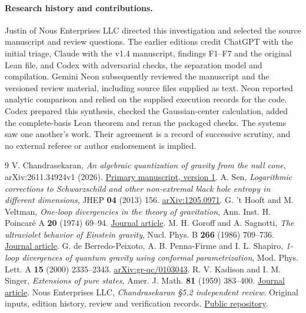 \documentclass[11pt]{article}
\begin{document}
\paragraph{Research history and contributions.}
Justin of Nous Enterprises LLC directed this investigation and selected the source manuscript and review questions. The earlier editions credit ChatGPT with the initial triage, Claude with the v1.4 manuscript, findings F1--F7 and the original Lean file, and Codex with adversarial checks, the separation model and compilation. Gemini Neon subsequently reviewed the manuscript and the versioned review material, including source files supplied as text. Neon reported analytic comparison and relied on the supplied execution records for the code. Codex prepared this synthesis, checked the Gaussian-center calculation, added the complete-basis Lean theorem and reran the packaged checks. The systems saw one another's work. Their agreement is a record of successive scrutiny, and no external referee or author endorsement is implied.

\clearpage{}
\begin{thebibliography}{9}
 V. Chandrasekaran, \emph{An algebraic quantization of gravity from the null cone}, arXiv:2611.34924v1 (2026). \href{https://arxiv.org/abs/2611.34924v1}{Primary manuscript, version 1}.
 A. Sen, \emph{Logarithmic corrections to Schwarzschild and other non-extremal black hole entropy in different dimensions}, JHEP \textbf{04} (2013) 156. \href{https://arxiv.org/abs/1205.0971}{arXiv:1205.0971}.
 G. 't Hooft and M. Veltman, \emph{One-loop divergencies in the theory of gravitation}, Ann. Inst. H. Poincar\'e A \textbf{20} (1974) 69--94. \href{https://www.numdam.org/item/AIHPA_1974__20_1_69_0/}{Journal article}.
 M. H. Goroff and A. Sagnotti, \emph{The ultraviolet behavior of Einstein gravity}, Nucl. Phys. B \textbf{266} (1986) 709--736. \href{https://doi.org/10.1016/0550-3213(86)90193-8}{Journal article}.
 G. de Berredo-Peixoto, A. B. Penna-Firme and I. L. Shapiro, \emph{1-loop divergences of quantum gravity using conformal parametrization}, Mod. Phys. Lett. A \textbf{15} (2000) 2335--2343. \href{https://arxiv.org/abs/gr-qc/0103043}{arXiv:gr-qc/0103043}.
 R. V. Kadison and I. M. Singer, \emph{Extensions of pure states}, Amer. J. Math. \textbf{81} (1959) 383--400. \href{https://doi.org/10.2307/2372748}{Journal article}.
 Nous Enterprises LLC, \emph{Chandrasekaran \S5.2 independent review}. Original inputs, edition history, review and verification records. \href{https://github.com/nousentllc/chandrasekaran-section-5-2-review}{Public repository}.
\end{thebibliography}
\end{document}

